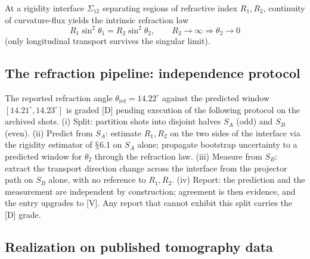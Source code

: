 \documentclass[11pt]{article}
\theoremstyle{definition}
\theoremstyle{plain}
\begin{document}
At a rigidity interface $\Sigma_{12}$ separating regions of refractive index
$R_1, R_2$, continuity of curvature-flux yields the intrinsic refraction law
\begin{equation}
R_1\sin^2\theta_1 = R_2\sin^2\theta_2, \qquad R_2 \to \infty \Rightarrow
\theta_2 \to 0
\end{equation}
(only longitudinal transport survives the singular limit).

\subsection{The refraction pipeline: independence protocol}

The reported refraction angle $\theta_{\mathrm{ref}} = 14.22^\circ$ against the
predicted window $[14.21^\circ, 14.23^\circ]$ is graded [D] pending execution of
the following protocol on the archived shots. (i) Split: partition shots into
disjoint halves $S_A$ (odd) and $S_B$ (even). (ii) Predict from $S_A$: estimate
$R_1, R_2$ on the two sides of the interface via the rigidity estimator of $\mathsection$6.1
on $S_A$ alone; propagate bootstrap uncertainty to a predicted window for
$\theta_2$ through the refraction law. (iii) Measure from $S_B$: extract the
transport direction change across the interface from the projector path on $S_B$
alone, with no reference to $R_1, R_2$. (iv) Report: the prediction and the
measurement are independent by construction; agreement is then evidence, and the
entry upgrades to [V]. Any report that cannot exhibit this split carries the [D]
grade.

\subsection{Realization on published tomography data}
\end{document}
